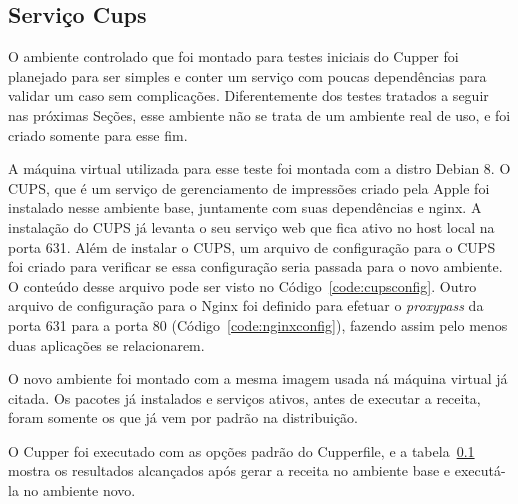 \subsection{Serviço Cups}
O ambiente controlado que foi montado para testes iniciais do Cupper foi planejado
para ser simples e conter um serviço com poucas dependências para validar um caso
sem complicações. Diferentemente dos testes tratados a seguir nas próximas Seções,
esse ambiente não se trata de um ambiente real de uso, e foi criado somente para
esse fim.

A máquina virtual utilizada para esse teste foi montada com a distro Debian 8.
O CUPS, que é um serviço de gerenciamento de impressões criado pela Apple foi
instalado nesse ambiente base, juntamente com suas dependências e nginx. A instalação
do CUPS já levanta o seu serviço web que fica ativo no host local na porta 631.
Além de instalar o CUPS, um arquivo de configuração para o CUPS foi criado
para verificar se essa configuração seria passada para o novo ambiente. O
conteúdo desse arquivo pode ser visto no Código~\ref{code:cupsconfig}. Outro 
arquivo de configuração para o Nginx foi definido para efetuar o 
\textit{proxypass} da porta 631 para a porta 80 (Código~\ref{code:nginxconfig}), fazendo assim pelo menos duas
aplicações se relacionarem.

O novo ambiente foi montado com a mesma imagem usada ná máquina virtual já citada.
Os pacotes já instalados e serviços ativos, antes de executar a receita, foram somente 
os que já vem por padrão na distribuição.

O Cupper foi executado com as opções padrão do Cupperfile, e a tabela~\ref{}
mostra os resultados alcançados após gerar a receita no ambiente base e executá-la
no ambiente novo.


